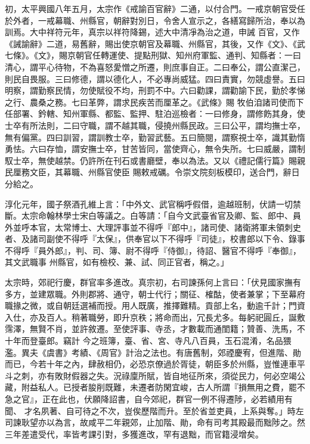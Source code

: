\begin{pinyinscope}
 初，太平興國八年五月，太宗作《戒諭百官辭》二通，以付合門。一戒京朝官受任於外者，一戒幕職、州縣官，朝辭對別日，令舍人宣示之，各繕寫歸所治，奉以為訓焉。大中祥符元年，真宗以祥符降錫，述大中清凈為治之道，申誡
 百官，又作《誡諭辭》二道，易舊辭，賜出使京朝官及幕職、州縣官，其後，又作《文》、《武七條》。《文》，賜京朝官任轉運使、提點刑獄、知州府軍監、通判、知縣者：一曰清心，謂平心待物，不為喜怒愛憎之所遷，則庶事自正。二曰奉公，謂公直潔己，則民自畏服。三曰修德，謂以德化人，不必專尚威猛。四曰責實，勿競虛譽。五曰明察，謂勤察民情，勿使賦役不均，刑罰不中。六曰勸課，謂勸諭下民，勤於孝悌之行、農桑之務。七曰革弊，謂求民疾苦而厘革之。《武條》賜
 牧伯洎諸司使而下任部署、鈐轄、知州軍縣、都監、監押、駐泊巡檢者：一曰修身，謂修飭其身，使士卒有所法則，二曰守職，謂不越其職，侵撓州縣民政。三曰公平，謂均撫士卒，無有偏黨。四曰訓習，謂訓教士卒，勤習武藝。五曰簡閱，謂察視士卒，識其勤惰勇怯。六曰存恤，謂安撫士卒，甘苦皆同，當使齊心，無令失所。七曰威嚴，謂制馭士卒，無使越禁。仍許所在刊石或書廳壁，奉以為法。又以《禮記儒行篇》賜親民厘務文臣，其幕職、州縣官使臣
 賜敕戒礪。令崇文院刻板模印，送合門，辭日分給之。



 淳化元年，國子祭酒孔維上言：「中外文、武官稱呼假借，逾越班制，伏請一切禁斷。太宗命翰林學士宋白等議之。白等請：「自今文武臺省官及卿、監、郎中、員外並呼本官，太常博士、大理評事並不得呼『郎中』，諸司使、諸衛將軍未領刺史者、及諸司副使不得呼『太保』，供奉官以下不得呼『司徒』，校書郎以下令、錄事不得呼『員外郎』，判、司、簿、尉不得呼『侍御』，待詔、醫官不得呼『奉御』，其文武職事
 州縣官，如有檢校、兼、試、同正官者，稱之。」



 太宗時，郊祀行慶，群官率多進改。真宗初，右司諫孫何上言曰：「伏見國家撫有多方，並建眾職。外則郡將、通守，朝士代行；關征、榷酤，使者兼掌；下至幕府職掾之微，或自朝廷選補而授。用人既廣，推擇難精。貢部上名，動逾千計；門資入仕，亦及百人。稍著職勞，即升京秩；將命而出，冗長尤多。每躬祀圓丘，誕敷霈澤，無賢不肖，並許敘遷。至使評事、寺丞，才數載而通閨籍；贊善、洗馬，不十年而登臺郎。竊計
 今之班簿，臺、省、宮、寺凡八百員，玉石混淆，名品猥濫。異夫《虞書》考績、《周官》計治之法也。有唐舊制，郊禋慶宥，但進階、勛而已，今若十年之內，肆赦相仍，必恐京僚過於胥徒，朝臣多於州縣，豈惟連車平斗之刺，亦有敗財假器之失。況祿廩所賦，皆自地征所來，須從民力，何必空竭公藏，附益私人。已授者朘削既難，未遷者防閑宜峻，古人所謂『損無用之費，罷不急之官』，正在此也，伏願降詔書，自今郊祀，群官一例不得遷陟，必若績用有聞、
 才名夙著、自可待之不次，豈俟歷階而升。至於省並吏員，上系與奪。」時左司諫耿望亦以為言，故咸平二年親郊，止加階、勛，命有司考其殿最而黜陟之。然三年差遣受代，率皆考課引對，多獲進改，罕有退黜，而官籍浸增矣。




\end{pinyinscope}
